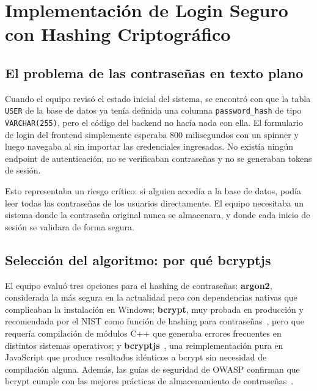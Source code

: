 \documentclass[journal]{IEEEtran}
\begin{document}
	
	
	\section{Implementaci\'{o}n de Login Seguro con Hashing
		Criptogr\'{a}fico}
	\label{sec:auth}
	
	\subsection{El problema de las contrase\~{n}as en texto plano}
	\label{subsec:problema-contrasenas}
	
	Cuando el equipo revis\'{o} el estado inicial del sistema, se
	encontr\'{o} con que la tabla \texttt{USER} de la base de datos
	ya ten\'{i}a definida una columna \texttt{password\_hash} de tipo
	\texttt{VARCHAR(255)}, pero el c\'{o}digo del backend no hac\'{i}a
	nada con ella. El formulario de login del frontend simplemente
	esperaba 800 milisegundos con un spinner y luego navegaba al
	sin importar las credenciales ingresadas. No exist\'{i}a
	ning\'{u}n endpoint de autenticaci\'{o}n, no se verificaban
	contrase\~{n}as y no se generaban tokens de sesi\'{o}n.
	
	Esto representaba un riesgo cr\'{i}tico: si alguien acced\'{i}a
	a la base de datos, pod\'{i}a leer todas las contrase\~{n}as de
	los usuarios directamente. El equipo necesitaba un sistema donde
	la contrase\~{n}a original nunca se almacenara, y donde cada
	inicio de sesi\'{o}n se validara de forma segura.
	
	\subsection{Selecci\'{o}n del algoritmo: por qu\'{e} bcryptjs}
	\label{subsec:seleccion-bcrypt}
	
	El equipo evalu\'{o} tres opciones para el hashing de
	contrase\~{n}as: \textbf{argon2}, considerada la m\'{a}s segura
	en la actualidad pero con dependencias nativas que complicaban
	la instalaci\'{o}n en Windows; \textbf{bcrypt}, muy probada en
	producci\'{o}n y recomendada por el NIST como funci\'{o}n de
	hashing para contrase\~{n}as~\cite{NIST:2020}, pero que
	requer\'{i}a compilaci\'{o}n de m\'{o}dulos C++ que generaba
	errores frecuentes en distintos sistemas operativos; y
	\textbf{bcryptjs}~\cite{bcryptjs:2023}, una reimplementaci\'{o}n
	pura en JavaScript que produce resultados id\'{e}nticos a bcrypt
	sin necesidad de compilaci\'{o}n alguna. Adem\'{a}s, las
	gu\'{i}as de seguridad de OWASP confirman que bcrypt cumple con
	las mejores pr\'{a}cticas de almacenamiento de
	contrase\~{n}as~\cite{OWASP:2024}.
	
\end{document}
